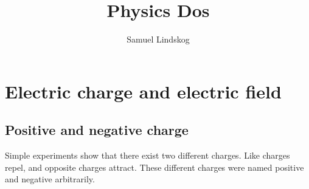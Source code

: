 \documentclass[nobib,notoc]{tufte-handout}
\begin{document}
\theoremstyle{definition}\newtheorem{defi}{Definition}[section]
\theoremstyle{definition}\newtheorem{axiom}{Axiom}[section]
\theoremstyle{definition}\newtheorem{thm}{Theorem}[section]
\theoremstyle{definition}\newtheorem{cor}{Corollary}[section]
\theoremstyle{definition}\newtheorem{lem}{Lemma}[section]
\theoremstyle{remark}\newtheorem*{notat}{Notation}
\theoremstyle{remark}\newtheorem*{rema}{Remark}
\theoremstyle{definition}\newtheorem{problem}{Problem}
\newenvironment{prob}[1]{\protect\setcounter{problem}{#1}\addtocounter{problem}{-1}\begin{problem}}{\end{problem}}

\title{Physics Dos}
\author{Samuel Lindskog}
\maketitle

\setcounter{section}{1}
\setcounter{tocdepth}{1}

\section{Electric charge and electric field}
\subsection{Positive and negative charge}
Simple experiments show that there exist two different charges. Like charges repel, and opposite charges attract. These different charges were named positive and negative arbitrarily.
\end{document}
